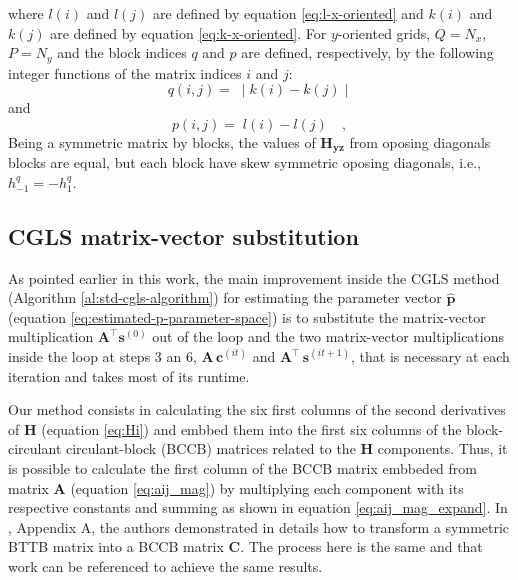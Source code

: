where $l(i)$ and $l(j)$ are defined by equation \ref{eq:l-x-oriented} 
and $k(i)$ and $k(j)$ are defined by equation \ref{eq:k-x-oriented}.
For $y$-oriented grids, $Q = N_{x}$, $P = N_{y}$ and the block indices
$q$ and $p$ are defined, respectively, by the following integer functions 
of the matrix indices $i$ and $j$:
\begin{equation}
	q(i, j) = \; \mid k(i) - k(j) \mid
	\label{eq:Hyz-q-y-oriented}
\end{equation}
and
\begin{equation}
	p(i, j) = \; l(i) - l(j) \quad ,
	\label{eq:Hyz-p-y-oriented}
\end{equation}
Being a symmetric matrix by blocks, the values of $\mathbf{H_{yz}}$ from oposing diagonals blocks are equal, but each block have skew symmetric oposing diagonals, i.e., $h^{q}_{-1} = - h^{q}_{1}$.

\subsection{CGLS matrix-vector substitution}

As pointed earlier in this work, the main improvement inside the CGLS method (Algorithm \ref{al:std-cgls-algorithm}) for estimating the parameter vector $\hat{\mathbf{p}}$ (equation \ref{eq:estimated-p-parameter-space}) is to substitute the matrix-vector multiplication $\mathbf{A}^{\top} \mathbf{s}^{(0)}$ out of the loop and the two matrix-vector multiplications inside the loop at steps 3 an 6, $\mathbf{A} \, \mathbf{c}^{(it)}$ and $\mathbf{A}^{\top} \, \mathbf{s}^{(it + 1)}$, that is necessary at each iteration and takes most of its runtime.

Our method consists in calculating the six first columns of the second derivatives of $\mathbf{H}$ (equation \ref{eq:Hi}) and embbed them into the first six columns of the block-circulant circulant-block (BCCB) matrices related to the $\mathbf{H}$ components. Thus, it is possible to calculate the first column of the BCCB matrix embbeded from matrix $\mathbf{A}$ (equation \ref{eq:aij_mag}) by multiplying each component with its respective constants and summing as shown in equation \ref{eq:aij_mag_expand}. In \cite{takahashi2020convolutional}, Appendix A, the authors demonstrated in details how to transform a symmetric BTTB matrix into a BCCB matrix $\mathbf{C}$. The process here is the same and that work can be referenced to achieve the same results.

